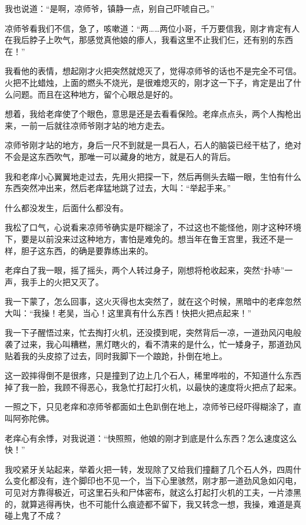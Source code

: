 我也说道：“是啊，凉师爷，镇静一点，别自己吓唬自己。”

凉师爷看我们不信，急了，咳嗽道：“两……两位小哥，千万要信我，刚才肯定有人在我后脖子上吹气，那感觉真他娘的瘆人，我看这里不止我们仨，还有别的东西在！”

我看他的表情，想起刚才火把突然就熄灭了，觉得凉师爷的话也不是完全不可信。火把不比蜡烛，上面的燃头不烧光，是很难熄灭的，刚才这一下子，肯定是出了什么问题。而且在这种地方，留个心眼总是好的。

想着，我给老痒使了个眼色，意思是还是去看看保险。老痒点点头，两个人掏枪出来，一前一后就往凉师爷刚才站的地方走去。

凉师爷刚才站的地方，身后一尺不到就是一具石人，石人的脑袋已经干枯了，绝对不会是这东西吹气，那唯一可以藏身的地方，就是石人的背后。

我和老痒小心翼翼地走过去，先用火把探一下，然后再侧头去瞄一眼，生怕有什么东西突然冲出来，然后老痒猛地跳了过去，大叫：“举起手来。”

什么都没发生，后面什么都没有。

我松了口气，心说看来凉师爷确实是吓糊涂了，不过这也不能怪他，刚才这种环境下，要是以前没来过这种地方，害怕是难免的。想当年在鲁王宫里，我还不是一样，胆子这东西，的确是要靠练出来的。

老痒白了我一眼，摇了摇头，两个人转过身子，刚想将枪收起来，突然“扑哧”一声，我手上的火把又灭了。

我一下蒙了，怎么回事，这火灭得也太突然了，就在这个时候，黑暗中的老痒忽然大叫：“我操！老吴，当心！这里真有什么东西！快把火把点起来！”

我一下子醒悟过来，忙去掏打火机，还没摸到呢，突然背后一凉，一道劲风闪电般袭了过来，我心叫糟糕，黑灯瞎火的，看不清来的是什么，忙一矮身子，那道劲风贴着我的头皮掠了过去，同时我脚下一个踉跄，扑倒在地上。

这一跤摔得倒不是很疼，只是撞到了边上几个石人，稀里哗啦的，不知道什么东西掉了我一脸，我顾不得恶心，我急忙打起打火机，以最快的速度将火把点了起来。

一照之下，只见老痒和凉师爷都面如土色趴倒在地上，凉师爷已经吓得糊涂了，直叫阿弥陀佛。

老痒心有余悸，对我说道：“快照照，他娘的刚才到底是什么东西？怎么速度这么快！”

我咬紧牙关站起来，举着火把一转，发现除了又给我们撞翻了几个石人外，四周什么变化都没有，连个脚印也不见一个，当下心里骇然，刚才那一道劲风急如闪电，可见对方靠得极近，可这里石头和尸体密布，就这么打起打火机的工夫，一片漆黑的，就算逃得再快，也不可能什么痕迹都不留下，我又转念一想，我操，难道是真碰上鬼了不成？

